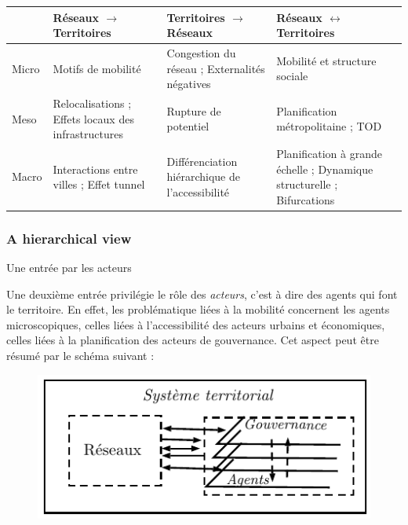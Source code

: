 \begin{table}[h!]
\begin{tabular}{|l|p{5cm}|p{5cm}|p{5cm}|}
\hline
 & Réseaux $\rightarrow$ Territoires & Territoires $\rightarrow$ Réseaux & Réseaux $\leftrightarrow$ Territoires\\ \hline
Micro & Motifs de mobilité & Congestion du réseau ; Externalités négatives & Mobilité et structure sociale \\ \hline
Meso & Relocalisations ; Effets locaux des infrastructures & Rupture de potentiel & Planification métropolitaine ; TOD \\ \hline
Macro & Interactions entre villes ; Effet tunnel & Différenciation hiérarchique de l'accessibilité & Planification à grande échelle ; Dynamique structurelle ; Bifurcations\\ \hline
\end{tabular}
\end{table}



\subsubsection*{A hierarchical view}{Une entrée par les acteurs}


Une deuxième entrée privilégie le rôle des \emph{acteurs}, c'est à dire des agents qui font le territoire. En effet, les problématique liées à la mobilité concernent les agents microscopiques, celles liées à l'accessibilité des acteurs urbains et économiques, celles liées à la planification des acteurs de gouvernance. Cet aspect peut être résumé par le schéma suivant :


\begin{figure}[h!]
\includegraphics[width=\textwidth]{Figures/Theory/processes_acteurs}
\end{figure}


